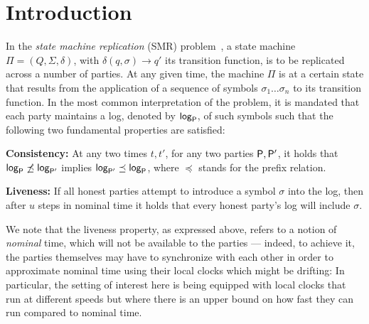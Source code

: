 \section{Introduction}
\label{sec:introduction}

In the \emph{state machine replication} (SMR) problem~\cite{CSUR:Schneider90}, a state machine $\Pi = (Q, \Sigma, \delta)$, with $\delta (q, \sigma) \rightarrow q'$ its transition function, is to be replicated across a number of parties.
%
At any given time, the machine $\Pi$ is at a certain state that results from the application of a sequence of symbols $\sigma_1 \ldots \sigma_n$ to its transition function.
%
In the most common interpretation of the problem, it is mandated that each party \party maintains a log, denoted by $\mathsf{log}_\mathsf{P}$, of such symbols such that the following two fundamental properties are satisfied:
%
\begin{cccItemize}[noitemsep]
    \item \textbf{Consistency:}  At any two times $t,t'$, for any two parties $\mathsf{P}, \mathsf{P}'$, it holds that $\mathsf{log}_\mathsf{P} \not \preceq \mathsf{log}_{\mathsf{P}'}$ implies $ \mathsf{log}_{\mathsf{P}'} \preceq \mathsf{log}_\mathsf{P} $, where  $\preceq$ stands for the prefix relation.

    \item \textbf{Liveness:} If all honest parties attempt to introduce a symbol $\sigma$ into the log, then after $u$ steps in nominal time it holds that every honest party's log will include  $\sigma$.
\end{cccItemize}

We note that the liveness property, as expressed above, refers to a notion of \emph{nominal} time, which will not be available to the parties --- indeed, to achieve it, the parties themselves may have to synchronize with each other in order to approximate nominal time using their local clocks which might be drifting:
%
In particular, the setting of interest here is being equipped with local clocks that run at different speeds but where there is an upper bound \clockDrift on how fast they can run compared to nominal time.

